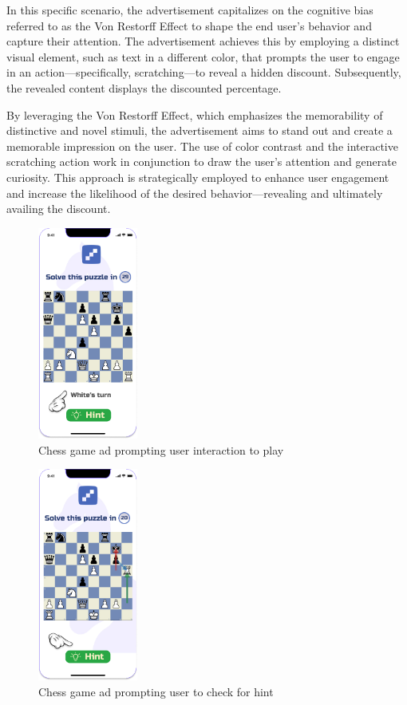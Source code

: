 \documentclass[journal]{IEEEtran}
\begin{document}
In this specific scenario, the advertisement capitalizes on the cognitive bias
referred to as the Von Restorff Effect to shape the end user's behavior and capture
their attention. The advertisement achieves this by employing a distinct visual element,
such as text in a different color, that prompts the user to engage in an action—specifically,
scratching—to reveal a hidden discount. Subsequently, the revealed content displays the
discounted percentage.

By leveraging the Von Restorff Effect, which emphasizes the memorability of distinctive
and novel stimuli, the advertisement aims to stand out and create a memorable impression
on the user. The use of color contrast and the interactive scratching action work in conjunction
to draw the user's attention and generate curiosity. This approach is strategically employed to
enhance user engagement and increase the likelihood of the desired behavior—revealing and
ultimately availing the discount.

\begin{figure}[H]
    \centering
    \includegraphics[height=7cm]{HCI-CHESS1.jpg}
    \caption{Chess game ad prompting user interaction to play}
\end{figure}

\begin{figure}[H]
    \centering
    \includegraphics[height=7cm]{HCI-CHESS2.jpg}
    \caption{Chess game ad prompting user to check for hint}
\end{figure}
\end{document}
